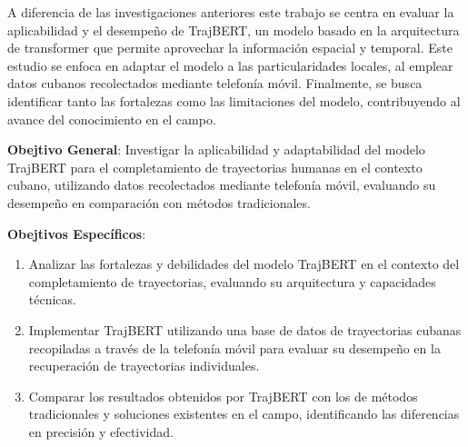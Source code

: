 A diferencia de las investigaciones anteriores este trabajo se centra en evaluar la aplicabilidad y el desempeño de TrajBERT, 
un modelo basado en la arquitectura de transformer que permite aprovechar la información espacial y temporal. Este estudio se 
enfoca en adaptar el modelo a las particularidades locales, al emplear datos cubanos recolectados mediante telefonía móvil. 
Finalmente, se busca identificar tanto las fortalezas como las limitaciones del modelo, contribuyendo al avance del conocimiento 
en el campo.

\textbf{Obejtivo General}: Investigar la aplicabilidad y adaptabilidad del modelo TrajBERT para el completamiento de trayectorias 
humanas en el contexto cubano, utilizando datos recolectados mediante telefonía móvil, evaluando su desempeño en comparación con 
métodos tradicionales.

\textbf{Obejtivos Específicos}:

\begin{enumerate}
    \item Analizar las fortalezas y debilidades del modelo TrajBERT en el contexto del completamiento de trayectorias, evaluando 
    su arquitectura y capacidades técnicas.
    \item Implementar TrajBERT utilizando una base de datos de trayectorias cubanas recopiladas a través de la telefonía móvil 
    para evaluar su desempeño en la recuperación de trayectorias individuales.
    \item Comparar los resultados obtenidos por TrajBERT con los de métodos tradicionales y soluciones existentes en el campo, 
    identificando las diferencias en precisión y efectividad.
\end{enumerate}